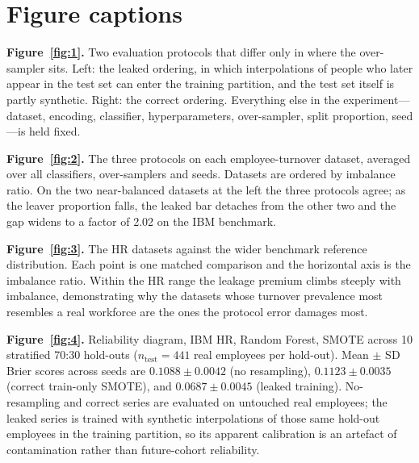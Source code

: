 \documentclass[12pt,a4paper]{article}
\begin{document}
\clearpage
\section*{Figure captions}
\noindent\textbf{Figure~\ref{fig:1}.} Two evaluation protocols that differ only in where the over-sampler sits. Left: the leaked ordering, in which interpolations of people who later appear in the test set can enter the training partition, and the test set itself is partly synthetic. Right: the correct ordering. Everything else in the experiment---dataset, encoding, classifier, hyperparameters, over-sampler, split proportion, seed---is held fixed.

\noindent\textbf{Figure~\ref{fig:2}.} The three protocols on each employee-turnover dataset, averaged over all classifiers, over-samplers and seeds. Datasets are ordered by imbalance ratio. On the two near-balanced datasets at the left the three protocols agree; as the leaver proportion falls, the leaked bar detaches from the other two and the gap widens to a factor of 2.02 on the IBM benchmark.

\noindent\textbf{Figure~\ref{fig:3}.} The HR datasets against the wider benchmark reference distribution. Each point is one matched comparison and the horizontal axis is the imbalance ratio. Within the HR range the leakage premium climbs steeply with imbalance, demonstrating why the datasets whose turnover prevalence most resembles a real workforce are the ones the protocol error damages most.

\noindent\textbf{Figure~\ref{fig:4}.} Reliability diagram, IBM HR, Random Forest, SMOTE across 10 stratified 70:30 hold-outs ($n_{\text{test}}=441$ real employees per hold-out). Mean $\pm$ SD Brier scores across seeds are $0.1088 \pm 0.0042$ (no resampling), $0.1123 \pm 0.0035$ (correct train-only SMOTE), and $0.0687 \pm 0.0045$ (leaked training). No-resampling and correct series are evaluated on untouched real employees; the leaked series is trained with synthetic interpolations of those same hold-out employees in the training partition, so its apparent calibration is an artefact of contamination rather than future-cohort reliability.
\end{document}
